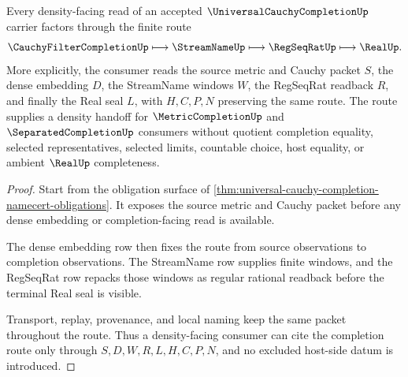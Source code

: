 \begin{theorem}
\label{thm:universal-cauchy-completion-density-route}
Every density-facing read of an accepted $\UniversalCauchyCompletionUp$ carrier factors through the finite route
$$
\CauchyFilterCompletionUp \longmapsto \StreamNameUp \longmapsto \RegSeqRatUp \longmapsto \RealUp .
$$
More explicitly, the consumer reads the source metric and Cauchy packet $S$, the dense embedding $D$, the StreamName windows $W$, the RegSeqRat readback $R$, and finally the Real seal $L$, with $H,C,P,N$ preserving the same route. The route supplies a density handoff for $\MetricCompletionUp$ and $\SeparatedCompletionUp$ consumers without quotient completion equality, selected representatives, selected limits, countable choice, host equality, or ambient $\RealUp$ completeness.
\end{theorem}
\begin{proof}
Start from the obligation surface of \autoref{thm:universal-cauchy-completion-namecert-obligations}. It exposes the source metric and Cauchy packet before any dense embedding or completion-facing read is available.

The dense embedding row then fixes the route from source observations to completion observations. The StreamName row supplies finite windows, and the RegSeqRat row repacks those windows as regular rational readback before the terminal Real seal is visible.

Transport, replay, provenance, and local naming keep the same packet throughout the route. Thus a density-facing consumer can cite the completion route only through $S,D,W,R,L,H,C,P,N$, and no excluded host-side datum is introduced.
\end{proof}

